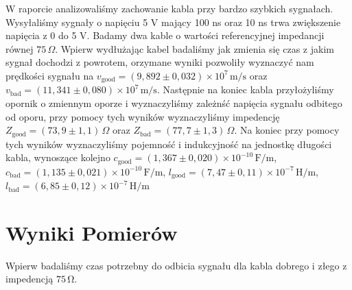 \documentclass[12pt]{article}
\title{}
\author{Kacper Kłos}
\begin{document}
\maketitle

W raporcie analizowaliśmy zachowanie kabla przy bardzo szybkich sygnałach. Wysyłaliśmy sygnały o napięciu 5 V mający 100 ns oraz 10 ns trwa zwiększenie napięcia z 0 do 5 V. Badamy dwa kable o wartości referencyjnej impedancji równej \(75 \, \Omega\). Wpierw wydłużając kabel badaliśmy jak zmienia się czas z jakim sygnał dochodzi z powrotem, orzymane wyniki pozwoliły wyznaczyć nam prędkości sygnału na \(v_{\mathrm{good}} = (9{,}892 \pm 0{,}032) \times 10^{7} \, \mathrm{m/s}\) oraz \(v_{\mathrm{bad}} = (11{,}341 \pm 0{,}080) \times 10^{7} \, \mathrm{m/s}\). Następnie na koniec kabla przyłożyliśmy opornik o zmiennym oporze i wyznaczyliśmy zależnść napięcia sygnału odbitego od oporu, przy pomocy tych wyników wyznaczyliśmy impedencję \(Z_{\mathrm{good}} = (73{,}9 \pm 1{,}1) \, \Omega\) oraz \(Z_{\mathrm{bad}} = (77{,}7 \pm 1{,}3) \, \Omega\). Na koniec przy pomocy tych wyników wyznaczyliśmy pojemność i indukcyjność na jednostkę długości kabla, wynoszące kolejno \(c_{\mathrm{good}} = (1{,}367 \pm 0{,}020) \times 10^{-10} \, \mathrm{F/m}\),  \(c_{\mathrm{bad}} = (1{,}135 \pm 0{,}021) \times 10^{-10} \, \mathrm{F/m}\), \(l_{\mathrm{good}} = (7{,}47 \pm 0{,}11) \times 10^{-7} \, \mathrm{H/m}\), \(l_{\mathrm{bad}} = (6{,}85 \pm 0{,}12) \times 10^{-7} \, \mathrm{H/m}\)

\newpage

\section{Wyniki Pomierów}
Wpierw badaliśmy czas potrzebny do odbicia sygnału dla kabla dobrego i złego z impedencją \(75 \, \mathrm{\Omega}\).
\end{document}
